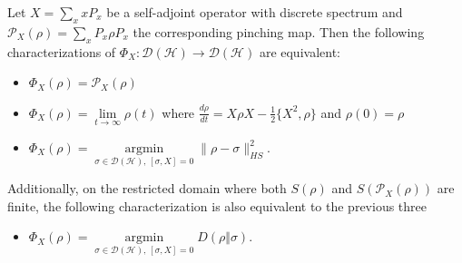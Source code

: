 \documentclass{techbrief}
\begin{document}
\begin{prop}\label{pinchingCharacterizations}
	Let $X=\sum_x xP_x$ be a self-adjoint operator with discrete spectrum and $\mathcal{P}_X(\rho)=\sum_xP_x\rho P_x$ the corresponding pinching map. Then the following characterizations of $\Phi_X:\mathcal{D}(\mathcal{H})\to\mathcal{D}(\mathcal{H})$ are equivalent:
	\begin{itemize}
		\item $\Phi_X(\rho)=\mathcal{P}_X(\rho)$
		\item $\Phi_X(\rho)=\lim\limits_{t\to\infty}\rho(t)$ where $\frac{d\rho}{dt}=X\rho X-\frac{1}{2}\{X^2,\rho\}$ and $\rho(0)=\rho$
		\item $\Phi_X(\rho)=\operatorname*{argmin}\limits_{\sigma\in\mathcal D(\mathcal H),\,[\sigma,X]=0}\|\rho-\sigma\|^2_{HS}$.
	\end{itemize}
	Additionally, on the restricted domain where both $S(\rho)$ and $S(\mathcal{P}_X(\rho))$ are finite, the following characterization is also equivalent to the previous three
	\begin{itemize}
		\item $\Phi_X(\rho)=\operatorname*{argmin}\limits_{\sigma\in\mathcal D(\mathcal H),\,[\sigma,X]=0}D(\rho\Vert\sigma)$.
	\end{itemize}
\end{prop}
\end{document}
